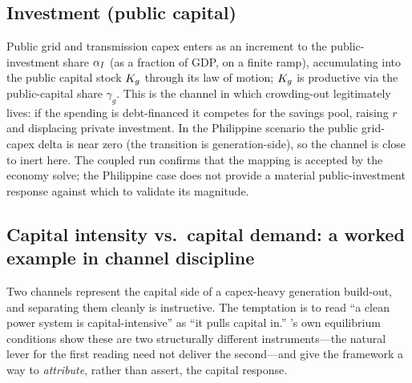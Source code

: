 \subsection{Investment (public capital)}\label{sec:ch-investment}
Public grid and transmission capex enters as an increment to the public-investment
share $\alpha_{I}$ (as a fraction of GDP, on a finite ramp), accumulating into the public
capital stock $K_{g}$ through its law of motion; $K_{g}$ is productive via the public-capital
share $\gamma_{g}$. This is the channel in which crowding-out legitimately lives: if the
spending is debt-financed it competes for the savings pool, raising $r$ and displacing
private investment. In the Philippine scenario the public grid-capex delta is near zero
(the transition is generation-side), so the channel is close to inert here. The coupled
run confirms that the mapping is accepted by the economy solve; the Philippine case does
not provide a material public-investment response against which to validate its magnitude.

\subsection{Capital intensity vs.\ capital demand: a worked example in channel discipline}
\label{sec:ch-capint}

Two channels represent the capital side of a capex-heavy generation build-out, and
separating them cleanly is instructive. The temptation is to read ``a clean power system
is capital-intensive'' as ``it pulls capital in.'' \OGCore{}'s own equilibrium conditions
show these are two structurally different instruments---the natural lever for the first
reading need not deliver the second---and give the framework a way to \emph{attribute},
rather than assert, the capital response.

